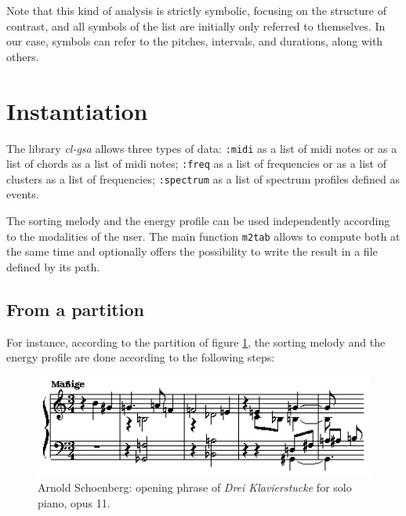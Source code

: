 \bigskip 

Note that this kind of analysis is strictly symbolic, focusing on the structure of contrast, and all symbols of the list are initially only referred to themselves. In our case, symbols can refer to the pitches, intervals, and durations, along with others.

\section{Instantiation}

The library \textsl{cl-gsa} allows three types of data: \texttt{:midi} as a list of midi notes or as a list of chords as a list of midi notes; \texttt{:freq} as a list of frequencies or as a list of clusters as a list of frequencies; \texttt{:spectrum} as a list of spectrum profiles defined as events.

The sorting melody and the energy profile can be used independently according to the modalities of the user. The main function \texttt{m2tab} allows to compute both at the same time and optionally offers the possibility to write the result in a file defined by its path.

\subsection{From a partition}

For instance, according to the partition of figure \ref{fig:op11}, the sorting melody and the energy profile are done according to the following steps:

\begin{figure}[!hbt]
	\begin{center}
		\includegraphics[scale=0.6]{img/2311}
		\caption{Arnold Schoenberg: opening phrase of \textit{Drei Klavierstucke} for solo piano, opus 11.}
		\label{fig:op11}
	\end{center}
\end{figure}

